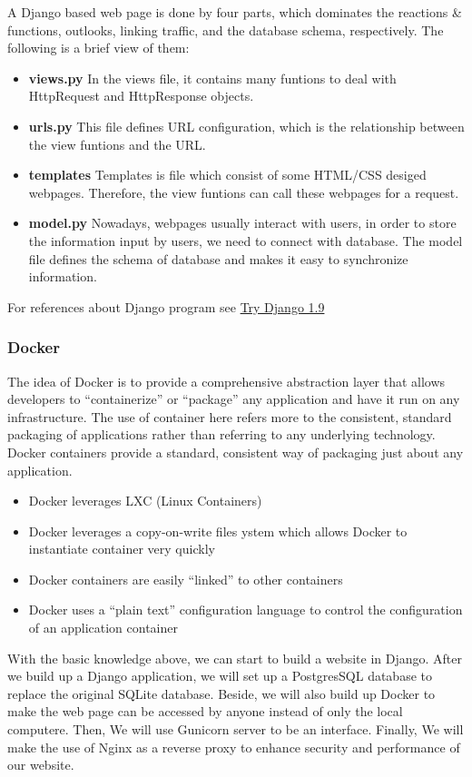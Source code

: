 A Django based web page is done by four parts, which dominates the reactions 
\& functions, outlooks, linking traffic, and the database schema, respectively. 
The following is a brief view of them:
\begin{itemize}
	\item[] \textbf{views.py}
	In the views file, it contains many funtions to deal with HttpRequest and  HttpResponse objects.
	\item[] \textbf{urls.py}
	This file defines URL configuration, which is the relationship between the view funtions and the URL.
	\item[] \textbf{templates}
	Templates is file which consist of some HTML/CSS desiged webpages. Therefore, the view funtions can call these webpages for a request.
	\item[] \textbf{model.py}
	Nowadays, webpages usually interact with users, in order to store the information input by users, we need to connect with database. 
	The model file defines the schema of database and makes it easy to synchronize information.\\
\end{itemize}
For references about Django program see \href{https://www.youtube.com/watch?v=yfgsklK_yFo&list=PLEsfXFp6DpzQFqfCur9CJ4QnKQTVXUsRy&index=1}{Try Django 1.9}

\subsubsection*{Docker}
The idea of Docker is to provide a comprehensive abstraction
layer that allows developers to “containerize” or “package” 
any application and have it run on any infrastructure. The 
use of container here refers more to the consistent, standard 
packaging of applications rather than referring to any underlying 
technology. Docker containers provide a standard, consistent way 
of packaging just about any application. 
\begin{itemize}
	\item Docker leverages LXC (Linux Containers)
	\item Docker leverages a copy-on-write files ystem which allows Docker to instantiate container very quickly
	\item Docker containers are easily “linked” to other containers
	\item Docker uses a “plain text” configuration language to control the configuration of an application container
\end{itemize}


With the basic knowledge above, we can start to build a website in Django. 
After we build up a Django application, we will set up a PostgresSQL database to replace the original SQLite database. 
Beside, we will also build up Docker to make the web page can be accessed by anyone instead of only the local computere.
Then, We will use Gunicorn server to be an interface. Finally, We will make the use of Nginx as a reverse proxy to enhance security and performance of our website.
